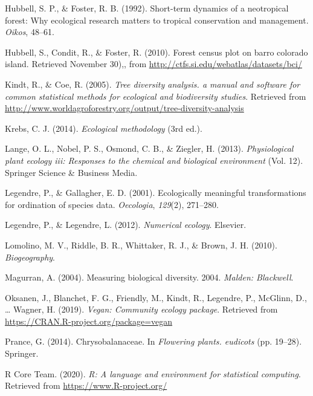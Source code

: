 \documentclass[11pt,]{article}
\begin{document}
\hypertarget{ref-hubbell1992short}{}
Hubbell, S. P., \& Foster, R. B. (1992). Short-term dynamics of a
neotropical forest: Why ecological research matters to tropical
conservation and management. \emph{Oikos}, 48--61.

\hypertarget{ref-Hubbell2010Forest}{}
Hubbell, S., Condit, R., \& Foster, R. (2010). Forest census plot on
barro colorado island. Retrieved November 30),, from
\url{http://ctfs.si.edu/webatlas/datasets/bci/}

\hypertarget{ref-biodiversityR}{}
Kindt, R., \& Coe, R. (2005). \emph{Tree diversity analysis. a manual
and software for common statistical methods for ecological and
biodiversity studies}. Retrieved from
\url{http://www.worldagroforestry.org/output/tree-diversity-analysis}

\hypertarget{ref-krebs1999ecological}{}
Krebs, C. J. (2014). \emph{Ecological methodology} (3rd ed.).

\hypertarget{ref-lange2013physiological}{}
Lange, O. L., Nobel, P. S., Osmond, C. B., \& Ziegler, H. (2013).
\emph{Physiological plant ecology iii: Responses to the chemical and
biological environment} (Vol. 12). Springer Science \& Business Media.

\hypertarget{ref-legendre2001ecologically}{}
Legendre, P., \& Gallagher, E. D. (2001). Ecologically meaningful
transformations for ordination of species data. \emph{Oecologia},
\emph{129}(2), 271--280.

\hypertarget{ref-legendre2012numerical}{}
Legendre, P., \& Legendre, L. (2012). \emph{Numerical ecology}.
Elsevier.

\hypertarget{ref-lomolino2017biogeography}{}
Lomolino, M. V., Riddle, B. R., Whittaker, R. J., \& Brown, J. H.
(2010). \emph{Biogeography}.

\hypertarget{ref-magurran2004measuring}{}
Magurran, A. (2004). Measuring biological diversity. 2004. \emph{Malden:
Blackwell}.

\hypertarget{ref-veganR}{}
Oksanen, J., Blanchet, F. G., Friendly, M., Kindt, R., Legendre, P.,
McGlinn, D., \ldots{} Wagner, H. (2019). \emph{Vegan: Community ecology
package}. Retrieved from \url{https://CRAN.R-project.org/package=vegan}

\hypertarget{ref-prance2014chrysobalanaceae}{}
Prance, G. (2014). Chrysobalanaceae. In \emph{Flowering plants.
eudicots} (pp. 19--28). Springer.

\hypertarget{ref-RStudio}{}
R Core Team. (2020). \emph{R: A language and environment for statistical
computing}. Retrieved from \url{https://www.R-project.org/}
\end{document}
